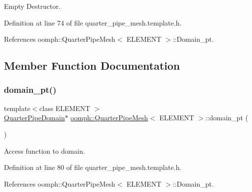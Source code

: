 Empty Destructor. 



Definition at line 74 of file quarter\+\_\+pipe\+\_\+mesh.\+template.\+h.



References oomph\+::\+Quarter\+Pipe\+Mesh$<$ E\+L\+E\+M\+E\+N\+T $>$\+::\+Domain\+\_\+pt.



\subsection{Member Function Documentation}
\mbox{\label{classoomph_1_1QuarterPipeMesh_a9a1bce41d07ab1bdb8f83e77f59c4a1b}} 
\subsubsection{\texorpdfstring{domain\+\_\+pt()}{domain\_pt()}\hspace{0.1cm}{\footnotesize\ttfamily [1/2]}}
{\footnotesize\ttfamily template$<$class E\+L\+E\+M\+E\+NT $>$ \\
\hyperlink{classoomph_1_1QuarterPipeDomain}{Quarter\+Pipe\+Domain}$\ast$ \hyperlink{classoomph_1_1QuarterPipeMesh}{oomph\+::\+Quarter\+Pipe\+Mesh}$<$ E\+L\+E\+M\+E\+NT $>$\+::domain\+\_\+pt (\begin{DoxyParamCaption}{ }\end{DoxyParamCaption})\hspace{0.3cm}{\ttfamily [inline]}}



Access function to domain. 



Definition at line 80 of file quarter\+\_\+pipe\+\_\+mesh.\+template.\+h.



References oomph\+::\+Quarter\+Pipe\+Mesh$<$ E\+L\+E\+M\+E\+N\+T $>$\+::\+Domain\+\_\+pt.

\mbox{\label{classoomph_1_1QuarterPipeMesh_ade9c9f2cbf3c9e722a480e7a056d4c63}} 
